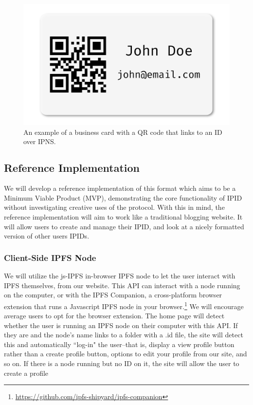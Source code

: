 \documentclass{article}
\begin{document}
\begin{figure}[h]
  \centering
  \includegraphics{resources/business_card.png}
  \caption{An example of a business card with a QR code that links to an ID over IPNS.}
\end{figure}

\subsection{Reference Implementation}

We will develop a reference implementation of this format which aims to be a Minimum Viable Product (MVP), demonstrating the core functionality of IPID without investigating creative uses of the protocol. With this in mind, the reference implementation will aim to work like a traditional blogging website. It will allow users to create and manage their IPID, and look at a nicely formatted version of other users IPIDs. 

\subsubsection{Client-Side IPFS Node}

We will utilize the js-IPFS in-browser IPFS node to let the user interact with IPFS themselves, from our website. This API can interact with a node running on the computer, or with the IPFS Companion, a cross-platform browser extension that runs a Javascript IPFS node in your browser.\footnote{\url{https://github.com/ipfs-shipyard/ipfs-companion}} We will encourage average users to opt for the browser extension. The home page will detect whether the user is running an IPFS node on their computer with this API. If they are and the node's name links to a folder with a .id file, the site will detect this and automatically ``log-in" the user--that is, display a view profile button rather than a create profile button, options to edit your profile from our site, and so on. If there is a node running but no ID on it, the site will allow the user to create a profile 
\end{document}
